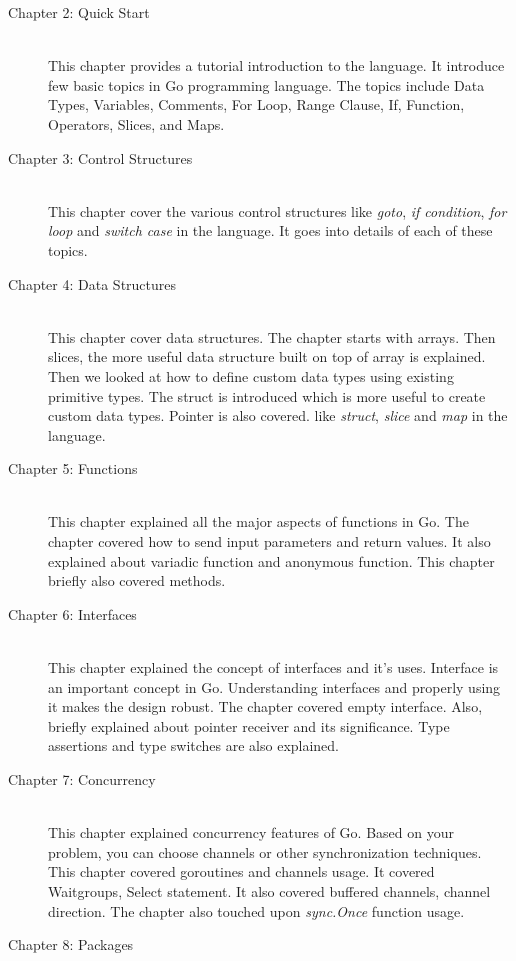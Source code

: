 \begin{description}
\item[Chapter 2: Quick Start] \hfill \\
This chapter provides a tutorial introduction to the language. It introduce few
basic topics in Go programming language. The topics include Data Types,
Variables, Comments, For Loop, Range Clause, If, Function, Operators, Slices,
and Maps.
\item[Chapter 3: Control Structures] \hfill \\
This chapter cover the various control structures like \textit{goto}, \textit{if
condition}, \textit{for loop} and \textit{switch case} in the language. It goes
into details of each of these topics.
\item[Chapter 4: Data Structures] \hfill \\
This chapter cover data structures. The chapter starts with arrays. Then slices,
the more useful data structure built on top of array is explained. Then we
looked at how to define custom data types using existing primitive types. The
struct is introduced which is more useful to create custom data types. Pointer
is also covered. like \textit{struct}, \textit{slice} and \textit{map} in the
language.
\item[Chapter 5: Functions] \hfill \\
This chapter explained all the major aspects of functions in Go. The chapter
covered how to send input parameters and return values. It also explained about
variadic function and anonymous function. This chapter briefly also covered
methods.
\item[Chapter 6: Interfaces] \hfill \\
This chapter explained the concept of interfaces and it's uses. Interface is an
important concept in Go. Understanding interfaces and properly using it makes
the design robust. The chapter covered empty interface. Also, briefly explained
about pointer receiver and its significance. Type assertions and type switches
are also explained.
\item[Chapter 7: Concurrency] \hfill \\
This chapter explained concurrency features of Go. Based on your problem, you
can choose channels or other synchronization techniques. This chapter covered
goroutines and channels usage. It covered Waitgroups, Select statement. It also
covered buffered channels, channel direction. The chapter also touched
upon \textit{sync.Once} function usage.
\item[Chapter 8: Packages] \hfill \\

\end{description}
